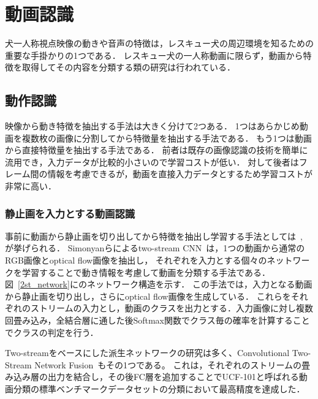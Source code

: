 \section{動画認識}
犬一人称視点映像の動きや音声の特徴は，レスキュー犬の周辺環境を知るための重要な手掛かりの1つである．
レスキュー犬の一人称動画に限らず，動画から特徴を取得してその内容を分類する類の研究は行われている．
\subsection{動作認識}
映像から動き特徴を抽出する手法は大きく分けて2つある．
1つはあらかじめ動画を複数枚の画像に分割してから特徴量を抽出する手法である．
もう1つは動画から直接特徴量を抽出する手法である．
前者は既存の画像認識の技術を簡単に流用でき，入力データが比較的小さいので学習コストが低い．
対して後者はフレーム間の情報を考慮できるが，動画を直接入力データとするため学習コストが非常に高い．
\subsubsection{}
\subsubsection{静止画を入力とする動画認識}
事前に動画から静止画を切り出してから特徴を抽出し学習する手法としては~\cite{simonyan2014two}, \cite{wang2015towards}が挙げられる．
Simonyanらによるtwo-stream CNN~\cite{simonyan2014two}は，1つの動画から通常のRGB画像とoptical flow画像を抽出し，
それぞれを入力とする個々のネットワークを学習することで動き情報を考慮して動画を分類する手法である．
図~\ref{2st_network}に\cite{simonyan2014two}のネットワーク構造を示す．
この手法では，入力となる動画から静止画を切り出し，さらにoptical flow画像を生成している．
これらをそれぞれのストリームの入力とし，動画のクラスを出力とする．入力画像に対し複数回畳み込み，全結合層に通した後Softmax関数でクラス毎の確率を計算することでクラスの判定を行う．

Two-streamをベースにした派生ネットワークの研究は多く、Convolutional Two-Stream Network Fusion~\cite{a}もその1つである。
これは，それぞれのストリームの畳み込み層の出力を結合し，その後FC層を追加することでUCF-101と呼ばれる動画分類の標準ベンチマークデータセットの分類において最高精度を達成した．

